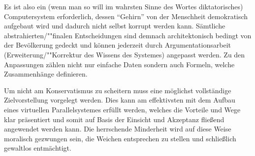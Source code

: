 Es ist also ein (wenn man so will im wahrsten Sinne des Wortes diktatorisches) Computersystem erforderlich, dessen "`Gehirn"' von der Menschheit demokratisch aufgebaut wird und dadurch nicht selbst korrupt werden kann. Sämtliche abstrahierten/""finalen Entscheidungen sind demnach architektonisch bedingt von der Bevölkerung gedeckt und können jederzeit durch Argumentationsarbeit (Erweiterung/""Korrektur des Wissens des Systemes) angepasst werden. Zu den Anpassungen zählen nicht nur einfache Daten sondern auch Formeln, welche Zusammenhänge definieren.

Um nicht am Konservatismus zu scheitern muss eine möglichst vollständige Zielvorstellung vorgelegt werden. Dies kann am effektivsten mit dem Aufbau eines virtuellen Parallelsystemes erfüllt werden, welches die Vorteile und Wege klar präsentiert und somit auf Basis der Einsicht und Akzeptanz fließend angewendet werden kann. Die herrschende Minderheit wird auf diese Weise moralisch gezwungen sein, die Weichen entsprechen zu stellen und schließlich gewaltlos entmächtigt.

